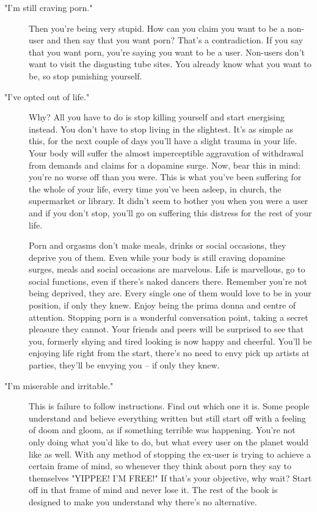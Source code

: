 \documentclass[easypeasy.tex]{subfiles}
\begin{document}
\begin{description}
\begin{description}
      \item ["I'm still craving porn."] Then you're being very stupid. How can you claim you want to be a non-user and then say that you want porn? That's a contradiction. If you say that you want porn, you're saying you want to be a user. Non-users don't want to visit the disgusting tube sites. You already know what you want to be, so stop punishing yourself.

      \item ["I've opted out of life."] Why? All you have to do is stop killing yourself and start energising instead. You don't have to stop living in the slightest. It's as simple as this, for the next couple of days you'll have a slight trauma in your life. Your body will suffer the almost imperceptible aggravation of withdrawal from demands and claims for a dopamine surge. Now, bear this in mind: you're no worse off than you were. This is what you've been suffering for the whole of your life, every time you've been asleep, in church, the supermarket or library. It didn't seem to bother you when you were a user and if you don't stop, you'll go on suffering this distress for the rest of your life.

      Porn and orgasms don't make meals, drinks or social occasions, they deprive you of them. Even while your body is still craving dopamine surges, meals and social occasions are marvelous. Life is marvellous, go to social functions, even if there's naked dancers there. Remember you're not being deprived, they are. Every single one of them would love to be in your position, if only they knew. Enjoy being the prima donna and centre of attention. Stopping porn is a wonderful conversation point, taking a secret pleasure they cannot. Your friends and peers will be surprised to see that you, formerly shying and tired looking is now happy and cheerful. You'll be enjoying life right from the start, there's no need to envy pick up artists at parties, they'll be envying you -- if only they knew.

     \item ["I'm miserable and irritable."] This is failure to follow instructions. Find out which one it is. Some people understand and believe everything written but still start off with a feeling of doom and gloom, as if something terrible was happening. You're not only doing what you'd like to do, but what every user on the planet would like as well. With any method of stopping the ex-user is trying to achieve a certain frame of mind, so whenever they think about porn they say to themselves "YIPPEE! I'M FREE!" If that's your objective, why wait? Start off in that frame of mind and never lose it. The rest of the book is designed to make you understand why there's no alternative.

\end{description}
\end{description}
\end{document}
